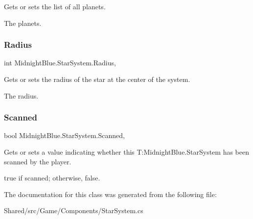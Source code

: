 Gets or sets the list of all planets. 

The planets.\hypertarget{class_midnight_blue_1_1_star_system_ad837a031fcd4a423ebb79cd8531d8a20}{}\label{class_midnight_blue_1_1_star_system_ad837a031fcd4a423ebb79cd8531d8a20} 
\subsubsection{\texorpdfstring{Radius}{Radius}}
{\footnotesize\ttfamily int Midnight\+Blue.\+Star\+System.\+Radius\hspace{0.3cm}{\ttfamily [get]}, {\ttfamily [set]}}



Gets or sets the radius of the star at the center of the system. 

The radius.\hypertarget{class_midnight_blue_1_1_star_system_ae0486aa129a103b96f1fbfe9e09b41ca}{}\label{class_midnight_blue_1_1_star_system_ae0486aa129a103b96f1fbfe9e09b41ca} 
\subsubsection{\texorpdfstring{Scanned}{Scanned}}
{\footnotesize\ttfamily bool Midnight\+Blue.\+Star\+System.\+Scanned\hspace{0.3cm}{\ttfamily [get]}, {\ttfamily [set]}}



Gets or sets a value indicating whether this T\+:\+Midnight\+Blue.\+Star\+System has been scanned by the player. 

{\ttfamily true} if scanned; otherwise, {\ttfamily false}.

The documentation for this class was generated from the following file\+:\begin{DoxyCompactItemize}
\item 
Shared/src/\+Game/\+Components/Star\+System.\+cs\end{DoxyCompactItemize}

